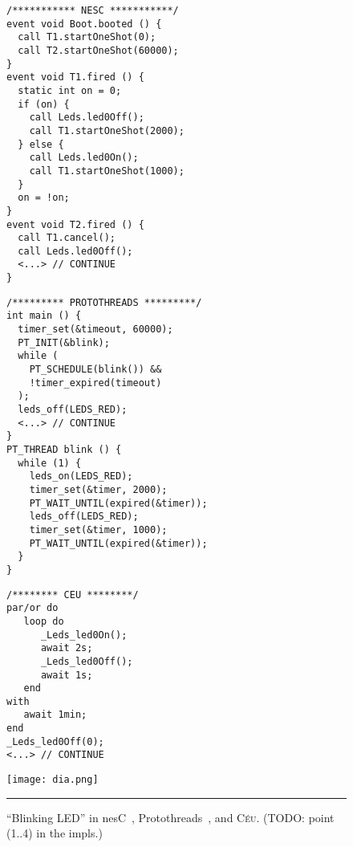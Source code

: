 \documentclass[10pt]{sensys-proc}
\newcommand{\CEU}{\textsc{C\'{e}u}\xspace}
\begin{document}
\begin{figure*}[!t]
\begin{minipage}[t]{0.24\linewidth}
{\small
\begin{verbatim}
/*********** NESC ***********/
event void Boot.booted () {
  call T1.startOneShot(0);
  call T2.startOneShot(60000);
}
event void T1.fired () {
  static int on = 0;
  if (on) {
    call Leds.led0Off();
    call T1.startOneShot(2000);
  } else {
    call Leds.led0On();
    call T1.startOneShot(1000);
  }
  on = !on;
}
event void T2.fired () {
  call T1.cancel();
  call Leds.led0Off();
  <...> // CONTINUE
}
\end{verbatim}
}
\end{minipage}
%
\hfill \vrule \hfill
\hspace{0.0cm}
%
\begin{minipage}[t]{0.28\linewidth}
{\small
\begin{verbatim}
/********* PROTOTHREADS *********/
int main () {
  timer_set(&timeout, 60000);
  PT_INIT(&blink);
  while (
    PT_SCHEDULE(blink()) &&
    !timer_expired(timeout)
  );
  leds_off(LEDS_RED);
  <...> // CONTINUE
}
PT_THREAD blink () {
  while (1) {
    leds_on(LEDS_RED);
    timer_set(&timer, 2000);
    PT_WAIT_UNTIL(expired(&timer));
    leds_off(LEDS_RED);
    timer_set(&timer, 1000);
    PT_WAIT_UNTIL(expired(&timer));
  }
}
\end{verbatim}
}
\end{minipage}
%
\hfill \vrule \hfill
\hspace{0.0cm}
%
\begin{minipage}[t]{0.18\linewidth}
{\small
\begin{verbatim}
/******** CEU ********/
par/or do
   loop do
      _Leds_led0On();
      await 2s;
      _Leds_led0Off();
      await 1s;
   end
with
   await 1min;
end
_Leds_led0Off(0);
<...> // CONTINUE
\end{verbatim}
}
\end{minipage}
%
\hfill \vrule \hfill
\hspace{0.0cm}
%
\begin{minipage}[t]{0.15\linewidth}
\vspace{0pt}
\centering
\texttt{[image: dia.png]}
\end{minipage}
%
\hspace{0.0cm}
%
\rule{18cm}{0.37pt}
\caption{ ``Blinking LED'' in
    nesC~\cite{wsn.nesc},
    Protothreads~\cite{wsn.protothreads},
    and \CEU.
    (TODO: point (1..4) in the impls.)
\label{lst.all}
}
\end{figure*}
\end{document}
